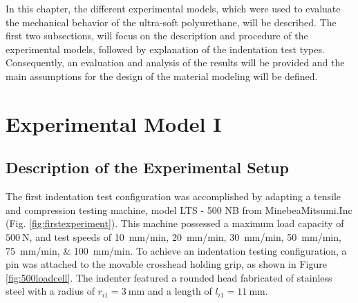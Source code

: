 In this chapter, the different experimental models, which were used to evaluate the 
mechanical behavior of the ultra-soft polyurethane, will be 
described. The first two subsections, will focus on the description and 
procedure of the experimental models, followed by explanation of the indentation test 
types. Consequently, an evaluation and analysis of the results will be provided and the 
main assumptions for the design of the material modeling will be defined. 

\section{Experimental Model I}
\label{section:expmod1}
    
\subsection*{Description of the Experimental Setup}

The first indentation test configuration was accomplished by adapting a tensile and compression 
testing machine, model LTS - 500 NB from MinebeaMitsumi.Inc (Fig. \ref{fig:firstexperiment}). This 
machine possessed a maximum load capacity of $\SI{500}{\newton}$, and test speeds of
\SIlist[per-mode = symbol]{10;20;30;50;75;100}{\milli \metre \per \minute}. To achieve an 
indentation testing configuration, a pin was attached to the movable crosshead holding grip, 
as shown in Figure \ref{fig:500loadcell}.
The indenter featured a rounded head fabricated of stainless steel with a
radius of $r_{i1} = \SI{3}{\milli \m}$ and a length of $l_{i1} = \SI{11}{\milli \m}$.

